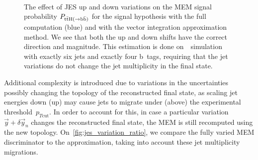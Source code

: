 \begin{figure}[ht]
\begin{centering}
\\
\caption[The distributions of the MEM signal and background probabilities]{The effect of JES up and down variations on the MEM signal probability $P_{\mathrm{t} \bar{\mathrm{t}} \mathrm{H} (\rightarrow \mathrm{b}\bar{\mathrm{b}})}$ for the signal hypothesis with the full computation (blue) and with the vector integration approximation method. We see that both the up and down shifts have the correct direction and magnitude. This estimation is done on~\ttHbb~simulation with exactly six jets and exactly four b~tags, requiring that the jet variations do not change the jet multiplicity in the final state.}
\label{fig:jes_variation}
\end{centering}
\end{figure}

Additional complexity is introduced due to variations in the uncertainties possibly changing the topology of the reconstructed final state, as scaling jet energies down (up) may cause jets to migrate under (above) the experimental threshold~$p_{T\mathrm{cut}}$. In order to account for this, in case a particular variation~$\vec{y} + \delta \vec{y}_n$ changes the reconstructed final state, the MEM is still recomputed using the new topology. On~\cref{fig:jes_variation_ratio}, we compare the fully varied MEM discriminator to the approximation, taking into account these jet multiplicity migrations.

